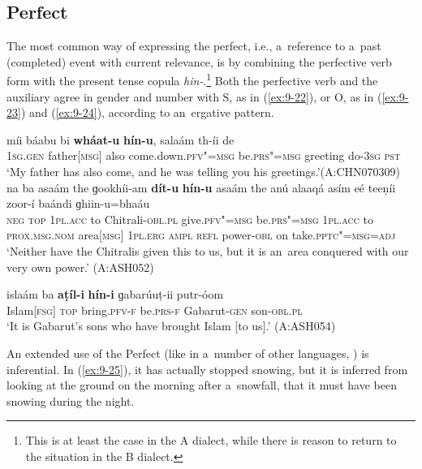 \subsection{Perfect}
\label{subsec:9-1-7}

The most common way of expressing the perfect, i.e., a~reference to a~past (completed) event with current relevance, is by combining the perfective verb form with the present tense copula \textit{hin-}.\footnote{This is at least the case in the A dialect, while there is reason to return to the situation in the B dialect.} Both the perfective verb and the auxiliary agree in gender and number with S, as in (\ref{ex:9-22}), or O, as in (\ref{ex:9-23}) and (\ref{ex:9-24}), according to an~ergative pattern.

\ea
\label{ex:9-22}
\gll míi báabu bi \textbf{wháat-u} \textbf{hín-u}, salaám th-íi de\\
\textsc{1sg.gen} father\textsc{[msg]} also come.down.\textsc{pfv"=msg} be.\textsc{prs"=msg} greeting do-\textsc{3sg} \textsc{pst} \\
\glt `My father has also come, and he was telling you his greetings.'\newline (A:CHN070309)
\ex
\label{ex:9-23}
\gll na ba asaám the ɡookhíi-am \textbf{dít-u} \textbf{hín-u} asaám the anú alaaqá asím eé teeṇíi zoor-í baándi ɡhiin-u=bhaáu\\
\textsc{neg} \textsc{top} \textsc{1pl.acc} to Chitrali-\textsc{obl.pl} give.\textsc{pfv"=msg}  be.\textsc{prs"=msg } \textsc{1pl.acc} to \textsc{prox.msg.nom} area\textsc{[msg]} \textsc{1pl.erg} \textsc{ampl} \textsc{refl} power-\textsc{obl} on take.\textsc{pptc"=msg=adj}\\
\glt `Neither have the Chitralis given this to us, but it is an~area conquered with our very own power.' (A:ASH052)

\ex
\label{ex:9-24}
\gll islaám ba \textbf{aṭíl-i} \textbf{hín-i} ɡabarúuṭ-ii putr-óom \\
Islam\textsc{[fsg]} \textsc{top} bring.\textsc{pfv-f} be.\textsc{prs-f} Gabarut-\textsc{gen} son-\textsc{obl.pl} \\
\glt `It is Gabarut's sons who have brought Islam [to us].' (A:ASH054) 
\z

An extended use of the Perfect (like in a~number of other languages, \citealt[152]{dahl1985}) is inferential. In (\ref{ex:9-25}), it has actually stopped snowing, but it is inferred from looking at the ground on the morning after a~snowfall, that it must have been snowing during the night.

